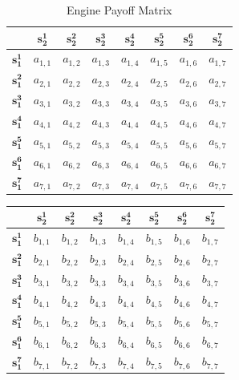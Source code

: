 {\renewcommand{\arraystretch}{1.5}
\begin{table}[h]
\centering 
\begin{tabular}{ |c|c|c|c|c|c|c|c| } 
\hline
      & $\mathbf{s_2^1}$ & $\mathbf{s_2^2}$ & $\mathbf{s_2^3}$ & $\mathbf{s_2^4}$ & $\mathbf{s_2^5}$ & $\mathbf{s_2^6}$ & $\mathbf{s_2^7}$ \\ \hline 
 $\mathbf{s_1^1}$ & $a_{1,1}$ & $a_{1,2}$ & $a_{1,3}$ & $a_{1,4}$ & $a_{1,5}$ & $a_{1,6}$ & $a_{1,7}$  \\ \hline
 $\mathbf{s_1^2}$ & $a_{2,1}$ & $a_{2,2}$ & $a_{2,3}$ & $a_{2,4}$ & $a_{2,5}$ & $a_{2,6}$ & $a_{2,7}$  \\ \hline
 $\mathbf{s_1^3}$ & $a_{3,1}$ & $a_{3,2}$ & $a_{3,3}$ & $a_{3,4}$ & $a_{3,5}$ & $a_{3,6}$ & $a_{3,7}$  \\ \hline
 $\mathbf{s_1^4}$ & $a_{4,1}$ & $a_{4,2}$ & $a_{4,3}$ & $a_{4,4}$ & $a_{4,5}$ & $a_{4,6}$ & $a_{4,7}$  \\ \hline
 $\mathbf{s_1^5}$ & $a_{5,1}$ & $a_{5,2}$ & $a_{5,3}$ & $a_{5,4}$ & $a_{5,5}$ & $a_{5,6}$ & $a_{5,7}$  \\ \hline
 $\mathbf{s_1^6}$ & $a_{6,1}$ & $a_{6,2}$ & $a_{6,3}$ & $a_{6,4}$ & $a_{6,5}$ & $a_{6,6}$ & $a_{6,7}$  \\ \hline
 $\mathbf{s_1^7}$ & $a_{7,1}$ & $a_{7,2}$ & $a_{7,3}$ & $a_{7,4}$ & $a_{7,5}$ & $a_{7,6}$ & $a_{7,7}$  \\ \hline
\end{tabular}
\caption{Engine Payoff Matrix}
\label{tab:payoffEngine}
\end{table}

\begin{table}[h]
\centering 
\begin{tabular}{ |c|c|c|c|c|c|c|c| } 
\hline
      & $\mathbf{s_2^1}$ & $\mathbf{s_2^2}$ & $\mathbf{s_2^3}$ & $\mathbf{s_2^4}$ & $\mathbf{s_2^5}$ & $\mathbf{s_2^6}$ & $\mathbf{s_2^7}$ \\ \hline
 $\mathbf{s_1^1}$ & $b_{1,1}$ & $b_{1,2}$ & $b_{1,3}$ & $b_{1,4}$ & $b_{1,5}$ & $b_{1,6}$ & $b_{1,7}$  \\ \hline
 $\mathbf{s_1^2}$ & $b_{2,1}$ & $b_{2,2}$ & $b_{2,3}$ & $b_{2,4}$ & $b_{2,5}$ & $b_{2,6}$ & $b_{2,7}$  \\ \hline
 $\mathbf{s_1^3}$ & $b_{3,1}$ & $b_{3,2}$ & $b_{3,3}$ & $b_{3,4}$ & $b_{3,5}$ & $b_{3,6}$ & $b_{3,7}$  \\ \hline
 $\mathbf{s_1^4}$ & $b_{4,1}$ & $b_{4,2}$ & $b_{4,3}$ & $b_{4,4}$ & $b_{4,5}$ & $b_{4,6}$ & $b_{4,7}$  \\ \hline
 $\mathbf{s_1^5}$ & $b_{5,1}$ & $b_{5,2}$ & $b_{5,3}$ & $b_{5,4}$ & $b_{5,5}$ & $b_{5,6}$ & $b_{5,7}$  \\ \hline
 $\mathbf{s_1^6}$ & $b_{6,1}$ & $b_{6,2}$ & $b_{6,3}$ & $b_{6,4}$ & $b_{6,5}$ & $b_{6,6}$ & $b_{6,7}$  \\ \hline
 $\mathbf{s_1^7}$ & $b_{7,1}$ & $b_{7,2}$ & $b_{7,3}$ & $b_{7,4}$ & $b_{7,5}$ & $b_{7,6}$ & $b_{7,7}$  \\ \hline


\end{tabular}
\end{table}}
